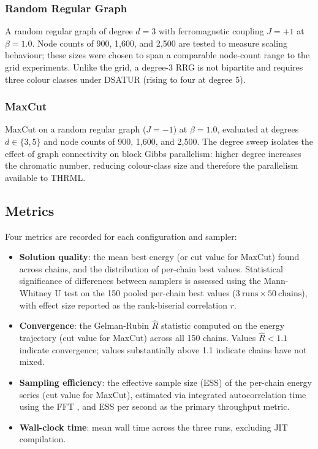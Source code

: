 \documentclass[conference]{IEEEtran}
\begin{document}
\subsubsection{Random Regular Graph}

A random regular graph of degree $d = 3$ with ferromagnetic coupling $J = +1$ at $\beta = 1.0$. Node counts of 900, 1,600, and 2,500 are tested to measure scaling behaviour; these sizes were chosen to span a comparable node-count range to the grid experiments. Unlike the grid, a degree-3 RRG is not bipartite and requires three colour classes under DSATUR (rising to four at degree 5).

\subsubsection{MaxCut}

MaxCut on a random regular graph ($J = -1$) at $\beta = 1.0$, evaluated at degrees $d \in \{3, 5\}$ and node counts of 900, 1,600, and 2,500. The degree sweep isolates the effect of graph connectivity on block Gibbs parallelism: higher degree increases the chromatic number, reducing colour-class size and therefore the parallelism available to THRML.

\subsection{Metrics}

Four metrics are recorded for each configuration and sampler:

\begin{itemize}
  \item \textbf{Solution quality}: the mean best energy (or cut value for MaxCut) found across chains, and the distribution of per-chain best values. Statistical significance of differences between samplers is assessed using the Mann-Whitney U test on the 150 pooled per-chain best values ($3\ \text{runs} \times 50\ \text{chains}$), with effect size reported as the rank-biserial correlation $r$.

  \item \textbf{Convergence}: the Gelman-Rubin $\hat{R}$ statistic \cite{gelman1992} computed on the energy trajectory (cut value for MaxCut) across all 150 chains. Values $\hat{R} < 1.1$ indicate convergence; values substantially above 1.1 indicate chains have not mixed.

  \item \textbf{Sampling efficiency}: the effective sample size (ESS) of the per-chain energy series (cut value for MaxCut), estimated via integrated autocorrelation time using the FFT \cite{geyer1992}, and ESS per second as the primary throughput metric.

  \item \textbf{Wall-clock time}: mean wall time across the three runs, excluding JIT compilation.
\end{itemize}
\end{document}
